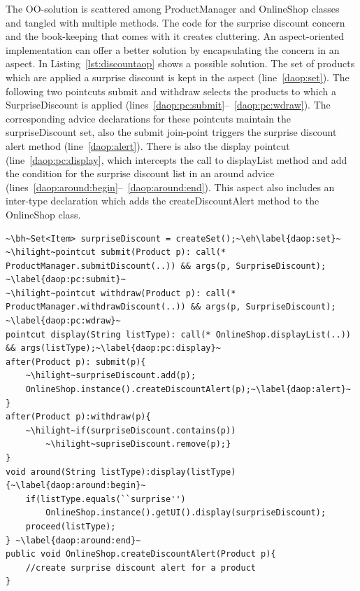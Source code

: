 The OO-solution is scattered among \textsf{ProductManager} and \textsf{OnlineShop} classes and tangled with multiple methods. The code for the surprise discount concern and the book-keeping that comes with it creates cluttering. 
An aspect-oriented implementation can offer a better solution by encapsulating the concern in an aspect. 
In Listing~\ref{lst:discountaop} shows a possible solution. The set of products which are applied a surprise discount is kept in the aspect (line~\ref{daop:set}). The following two pointcuts \textsf{submit} and \textsf{withdraw} selects the products to which a \textsf{SurpriseDiscount} is applied (lines~\ref{daop:pc:submit}--~\ref{daop:pc:wdraw}). The corresponding advice declarations for these pointcuts maintain the \textsf{surpriseDiscount} set, also the \textsf{submit} join-point triggers the surprise discount alert method (line~\ref{daop:alert}). There is also the \textsf{display} pointcut (line~\ref{daop:pc:display}, which intercepts the call to \textsf{displayList} method and add the condition for the surprise discount list in an around advice (lines~\ref{daop:around:begin}--~\ref{daop:around:end}). This aspect also includes an inter-type declaration which adds the \textsf{createDiscountAlert} method to the \textsf{OnlineShop} class.


\begin{lstlisting}[float=h, caption={An Aspectj implementation of discount alert concern}, label={lst:discountaop}]
~\bh~Set<Item> surpriseDiscount = createSet();~\eh\label{daop:set}~
~\hilight~pointcut submit(Product p): call(* ProductManager.submitDiscount(..)) && args(p, SurpriseDiscount); ~\label{daop:pc:submit}~
~\hilight~pointcut withdraw(Product p): call(* ProductManager.withdrawDiscount(..)) && args(p, SurpriseDiscount); ~\label{daop:pc:wdraw}~
pointcut display(String listType): call(* OnlineShop.displayList(..)) && args(listType);~\label{daop:pc:display}~
after(Product p): submit(p){
	~\hilight~surpriseDiscount.add(p);
	OnlineShop.instance().createDiscountAlert(p);~\label{daop:alert}~
}
after(Product p):withdraw(p){
	~\hilight~if(surpriseDiscount.contains(p))
		~\hilight~supriseDiscount.remove(p);}
}
void around(String listType):display(listType){~\label{daop:around:begin}~
	if(listType.equals(``surprise'')
		OnlineShop.instance().getUI().display(surpriseDiscount);
	proceed(listType);	
} ~\label{daop:around:end}~
public void OnlineShop.createDiscountAlert(Product p){
	//create surprise discount alert for a product
}
\end{lstlisting}

